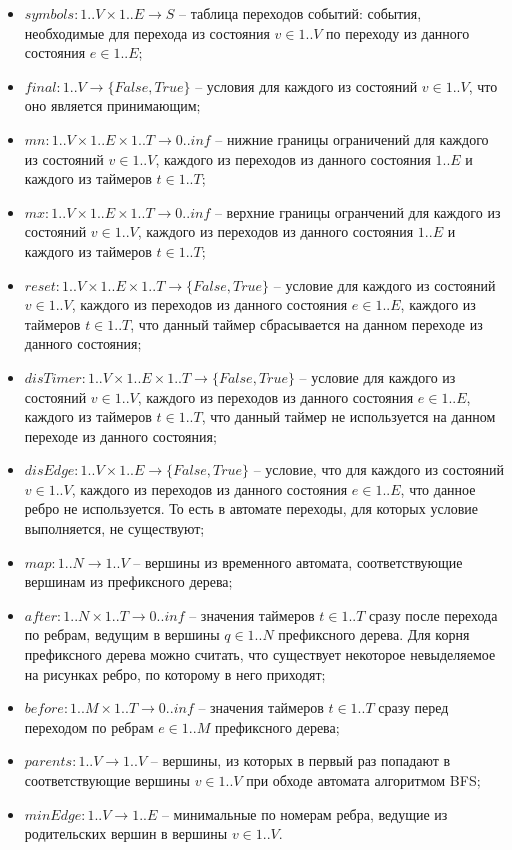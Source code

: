 \documentclass[times,specification,annotation]{itmo-student-thesis}
\begin{document}
\begin{itemize}
  \item $symbols: 1..V \times 1..E \rightarrow S$ -- таблица переходов событий: события, необходимые для перехода из состояния $v \in 1..V$ по переходу из данного состояния $e \in 1..E$;
  \item $final: 1..V \rightarrow \{ False, True \}$ -- условия для каждого из состояний $v \in 1..V$, что оно является принимающим;
  \item $mn: 1..V \times 1..E \times 1..T \rightarrow 0..inf$ -- нижние границы ограничений для каждого из состояний $v \in 1..V$, каждого из переходов из данного состояния $1..E$ и каждого из
    таймеров $t \in 1..T$;
  \item $mx: 1..V \times 1..E \times 1..T \rightarrow 0..inf$ -- верхние границы огранчений для каждого из состояний $v \in 1..V$, каждого из переходов из данного состояния $1..E$ и каждого из
    таймеров $t \in 1..T$;
  \item $reset: 1..V \times 1..E \times 1..T \rightarrow \{ False, True \}$ -- условие для каждого из состояний $v \in 1..V$, каждого из переходов из данного состояния $e \in 1..E$,
    каждого из таймеров $t \in 1..T$, что данный таймер сбрасывается на данном переходе из данного состояния;
  \item $disTimer: 1..V \times 1..E \times 1..T \rightarrow \{ False, True \}$ -- условие для каждого из состояний $v \in 1..V$, каждого из переходов из данного состояния $e \in 1..E$,
    каждого из таймеров $t \in 1..T$, что данный таймер не используется на данном переходе из данного состояния;
  \item $disEdge: 1..V \times 1..E \rightarrow \{ False, True \}$ -- условие, что для каждого из состояний $v \in 1..V$, каждого из переходов из данного состояния $e \in 1..E$,
    что данное ребро не используется. То есть в автомате переходы, для которых условие выполняется, не существуют;
  \item $map: 1..N \rightarrow 1..V$ -- вершины из временного автомата, соответствующие вершинам из префиксного дерева;
  \item $after: 1..N \times 1..T \rightarrow 0..inf$ -- значения таймеров $t \in 1..T$ сразу после перехода по ребрам, ведущим в вершины $q \in 1..N$ префиксного дерева. Для корня префиксного
    дерева можно считать, что существует некоторое невыделяемое на рисунках ребро, по которому в него приходят;
  \item $before: 1..M \times 1..T \rightarrow 0..inf$ -- значения таймеров $t \in 1..T$ сразу перед переходом по ребрам $e \in 1..M$ префиксного дерева;
  \item $parents: 1..V \rightarrow 1..V$ -- вершины, из которых в первый раз попадают в соответствующие вершины $v \in 1..V$ при обходе автомата алгоритмом BFS;
  \item $minEdge: 1..V \rightarrow 1..E$ -- минимальные по номерам ребра, ведущие из родительских вершин в вершины $v \in 1..V$.
\end{itemize}
\end{document}
